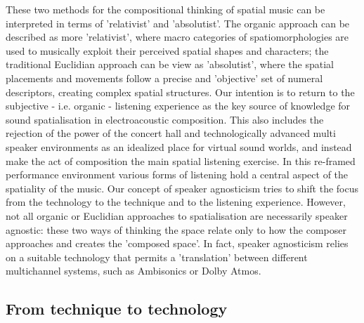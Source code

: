 \documentclass{article}
\begin{document}
These two methods for the compositional thinking of spatial music can be interpreted in terms of 'relativist' and 'absolutist'. The organic approach can be described as more 'relativist', where macro categories of spatiomorphologies are used to musically exploit their perceived spatial shapes and characters; the traditional Euclidian approach can be view as 'absolutist', where the spatial placements and movements follow a precise and 'objective' set of numeral descriptors, creating complex spatial structures. Our intention is to return to the subjective - i.e. organic - listening experience as the key source of knowledge for sound spatialisation in electroacoustic composition. This also includes the rejection of the power of the concert hall and technologically advanced multi speaker environments as an idealized place for virtual sound worlds, and instead make the act of composition the main spatial listening exercise. In this re-framed performance environment various forms of listening hold a central aspect of the spatiality of the music. Our concept of speaker agnosticism tries to shift the focus from the technology to the technique and to the listening experience.
However, not all organic or Euclidian approaches to spatialisation are necessarily speaker agnostic: these two ways of thinking the space relate only to how the composer approaches and creates the 'composed space'. In fact, speaker agnosticism relies on a suitable technology that permits a 'translation' between different multichannel systems, such as Ambisonics or Dolby Atmos. 

        \subsection{From technique to technology }
	\label{sec:technique}
 
\end{document}
